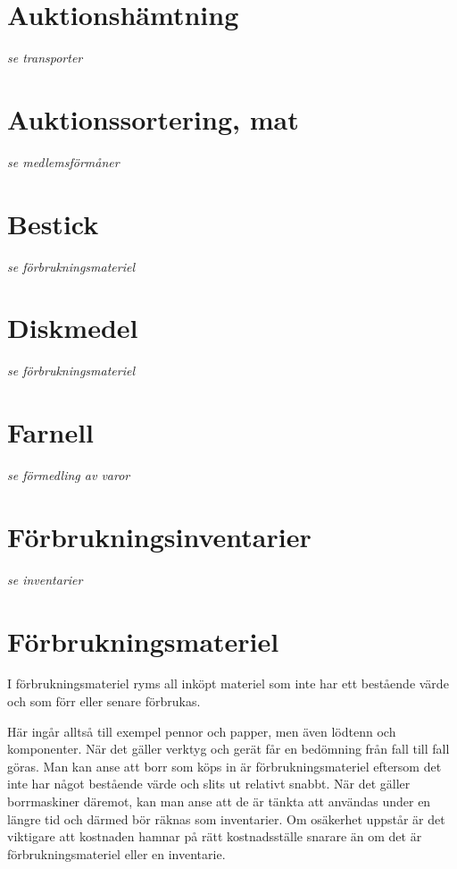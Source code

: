 
		
				\section{Auktionshämtning}
				\emph{se transporter}
			
				\section{Auktionssortering, mat}
				\emph{se medlemsförmåner}
			
				\section{Bestick}
				\emph{se förbrukningsmateriel}
			
				\section{Diskmedel}
				\emph{se förbrukningsmateriel}
			
				\section{Farnell}
				\emph{se förmedling av varor}
			
				\section{Förbrukningsinventarier}
				\emph{se inventarier}
			
				\section{Förbrukningsmateriel}
				
				I förbrukningsmateriel ryms all inköpt materiel som inte har ett bestående värde och som förr eller senare förbrukas.
		
		Här ingår alltså till exempel pennor och papper, men även lödtenn och komponenter. När det gäller verktyg och gerät får en bedömning från fall till fall göras. Man kan anse att borr som köps in är förbrukningsmateriel eftersom det inte har något bestående värde och slits ut relativt snabbt. När det gäller borrmaskiner däremot, kan man anse att de är tänkta att användas under en längre tid och därmed bör räknas som inventarier. Om osäkerhet uppstår är det viktigare att kostnaden hamnar på rätt kostnadsställe snarare än om det är förbrukningsmateriel eller en inventarie.
		
